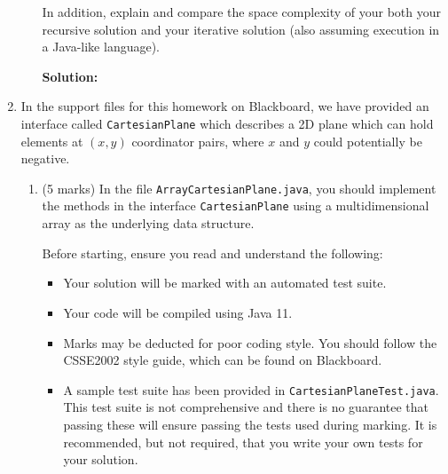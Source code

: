\documentclass[a4,13pt]{extarticle}
\newenvironment{Solution}{\color{blue}\textbf{Solution:}}{}
\begin{document}
\begin{enumerate}
\begin{enumerate}
	      	      In addition, explain and compare the space complexity of your both your recursive solution 
	      	      and your iterative solution (also assuming execution in a Java-like language).
	      	      
	        \begin{Solution}
	      	\end{Solution}
	      \end{enumerate}
	      	              
	      \newpage 
	      	          
	\item
	      In the support files for this homework on Blackboard, we have provided an interface called \texttt{CartesianPlane} which describes a 2D plane which can hold elements at $(x,y)$ coordinator pairs, where $x$ and $y$ could potentially be negative. 
	      \begin{enumerate}
	      	\item (5 marks) In the file \texttt{ArrayCartesianPlane.java}, you should implement the methods in the interface \texttt{CartesianPlane} using a multidimensional array as the underlying data structure.
	      	      	      	                      
	      	      Before starting, ensure you read and understand the following:
	      	      \begin{itemize}
	      	      		      	      	
	      	      	\item Your solution will be marked with an automated test suite. 
	      	      	      	      	      	                          
	      	      	\item Your code will be compiled using Java 11.
	      	      	      	      	      	                          
	      	      	\item Marks may be deducted for poor coding style. You should follow the CSSE2002 style guide, which can be found on Blackboard.
	      	      	      	      	      	                          
	      	      	\item  A sample test suite has been provided in \texttt{CartesianPlaneTest.java}. 
	      	      	      This test suite is not comprehensive and there is no guarantee that passing these will ensure passing 
	      	      	      the tests used during marking. It is recommended, but not required, that you write your own tests for your solution.
	      	      	      	      	    

\end{itemize}
\end{enumerate}
\end{enumerate}
\end{document}
